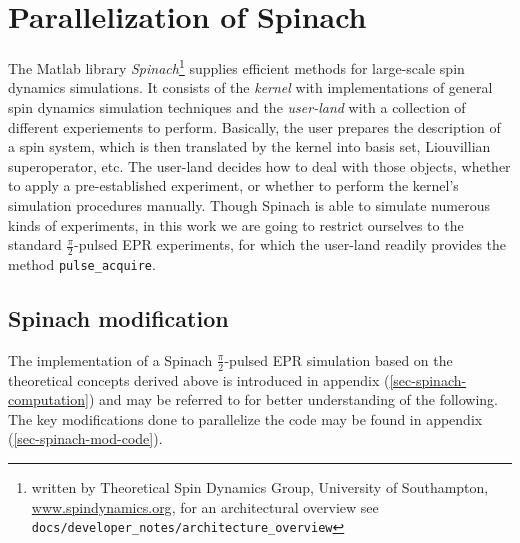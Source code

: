 \documentclass[11.5pt,a4paper]{article}
\begin{document}
\section{Parallelization of Spinach}

The Matlab library \emph{Spinach}\footnote{written by Theoretical Spin Dynamics Group, University of Southampton, \url{www.spindynamics.org}, for an architectural overview see \verb$docs/developer_notes/architecture_overview$} supplies efficient methods for large-scale spin dynamics simulations. It consists of the \emph{kernel} with implementations of general spin dynamics simulation techniques and the \emph{user-land} with a collection of different experiements to perform. Basically, the user prepares the description of a spin system, which is then translated by the kernel into basis set, Liouvillian superoperator, etc. The user-land decides how to deal with those objects, whether to apply a pre-established experiment, or whether to perform the kernel's simulation procedures manually. Though Spinach is able to simulate numerous kinds of experiments, in this work we are going to restrict ourselves to the standard $\tfrac{\pi}{2}$-pulsed EPR experiments, for which the user-land readily provides the method \verb|pulse_acquire|. 

\subsection{Spinach modification}
The implementation of a Spinach $\tfrac{\pi}{2}$-pulsed EPR simulation based on the theoretical concepts derived above is introduced in appendix (\ref{sec-spinach-computation}) and may be referred to for better understanding of the following. The key modifications done to parallelize the code may be found in appendix (\ref{sec-spinach-mod-code}).
\end{document}
